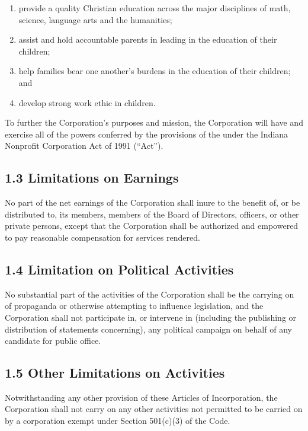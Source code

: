 \documentclass[
]{book}
\begin{document}
\begin{enumerate}
\def\labelenumi{\alph{enumi}.}
\item
  provide a quality Christian education across the major disciplines of math, science, language arts and the humanities;
\item
  assist and hold accountable parents in leading in the education of their children;
\item
  help families bear one another's burdens in the education of their children; and
\item
  develop strong work ethic in children.
\end{enumerate}

To further the Corporation's purposes and mission, the Corporation will have and exercise all of the powers conferred by the provisions of the under the Indiana Nonprofit Corporation Act of 1991 (``Act'').

\subsection{1.3 Limitations on Earnings}\label{limitations-on-earnings}

No part of the net earnings of the Corporation shall inure to the benefit of, or be distributed to, its members, members of the Board of Directors, officers, or other private persons, except that the Corporation shall be authorized and empowered to pay reasonable compensation for services rendered.

\subsection{1.4 Limitation on Political Activities}\label{limitation-on-political-activities}

No substantial part of the activities of the Corporation shall be the carrying on of propaganda or otherwise attempting to influence legislation, and the Corporation shall not participate in, or intervene in (including the publishing or distribution of statements concerning), any political campaign on behalf of any candidate for public office.

\subsection{1.5 Other Limitations on Activities}\label{other-limitations-on-activities}

Notwithstanding any other provision of these Articles of Incorporation, the Corporation shall not carry on any other activities not permitted to be carried on by a corporation exempt under Section 501(c)(3) of the Code.
\end{document}
